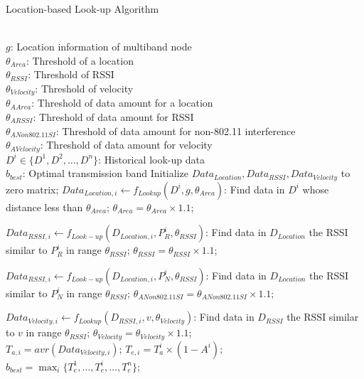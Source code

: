 	  \begin{algorithm}
          \small
	  \caption{Location-based Look-up Algorithm}
	  \label{algorithms: Location}
	  \begin{algorithmic}[1]
	  \REQUIRE  ~~\\
		  $g$: Location information of multiband node\\
		 $ \theta_{Area}$: Threshold of a location\\
		 $\theta_{RSSI}$: Threshold of RSSI\\
		 $\theta_{Velocity}$: Threshold of velocity\\
		 $\theta_{A Area}$: Threshold of data amount for a location\\
		 $\theta_{A RSSI}$: Threshold of data amount for RSSI\\
		 $\theta_{A Non 802.11 SI}$: Threshold of data amount for non-802.11 interference\\
		 $\theta_{A Velocity}$: Threshold of data amount for velocity\\
		 $D^i \in \{D^1,D^2,\dots,D^n\}$: Historical look-up data
\ENSURE ~~\\    
$b_{best}$: Optimal transmission band
\STATE Initialize \emph{$Data_{Location}, Data_{RSSI}, Data_{Velocity}$} to zero matrix;
\STATE $Data_{Location,i} \leftarrow f_{Lookup}(D^i,g,\theta_{Area})$: Find data in $D^i$ whose distance less than $\theta_{Area}$;
\STATE $\theta_{Area}=\theta_{Area} \times 1.1$;
\ENDWHILE

\STATE $Data_{RSSI,i} \leftarrow f_{Look-up}(D_{Location,i},P_R^i,\theta_{RSSI})$: Find data in $D_{Location}$ the RSSI similar to $P_R^i$ in range $\theta_{RSSI}$;
\STATE $\theta_{RSSI}=\theta_{RSSI} \times 1.1$;
\ENDWHILE

\STATE $Data_{RSSI,i} \leftarrow f_{Look-up}(D_{Location,i},P_N^i,\theta_{RSSI})$: Find data in $D_{Location}$ the RSSI similar to $P_N^i$ in range $\theta_{RSSI}$;
\STATE $\theta_{A Non 802.11 SI}=\theta_{A Non 802.11 SI} \times 1.1$;
\ENDWHILE

\STATE $Data_{Velocity,i} \leftarrow f_{Lookup}(D_{RSSI,i},v,\theta_{Velocity})$: Find data in $D_{RSSI}$ the RSSI similar to $v$ in range $\theta_{RSSI}$;
\STATE $\theta_{Velocity}=\theta_{Velocity} \times 1.1$;
\ENDWHILE \\

\STATE $T_{a,i}=avr(Data_{Velocity,i})$;
\STATE  $T_{e,i}=T_a^i\times(1-A^i)$;
\ENDFOR \\  
\STATE $b_{best} = \max_i\{T_e^1,\dots,T_e^i,\dots,T_e^n\}$;\\
\end{algorithmic}
\end{algorithm}

